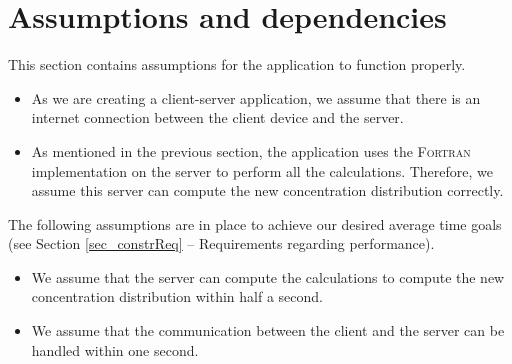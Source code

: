 \section{Assumptions and dependencies}
This section contains assumptions for the application to function properly.

\begin{itemize}
  \item As we are creating a client-server application, we assume that there is an internet connection between the client device and the server.
  \item As mentioned in the previous section, the application uses the \textsc{Fortran} implementation on the server to perform all the calculations. Therefore, we assume this server can compute the new concentration distribution correctly.
\end{itemize}

\noindent The following assumptions are in place to achieve our desired average time goals (see Section \ref{sec_constrReq} -- Requirements regarding performance). %

\begin{itemize}      
  \item We assume that the server can compute the calculations to compute the new concentration distribution within half a second.
  \item We assume that the communication between the client and the server can be handled within one second.
\end{itemize}
